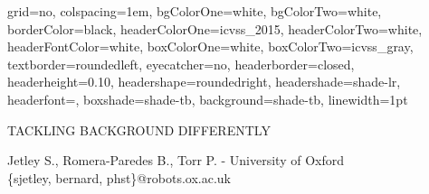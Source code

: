 \documentclass[ICVSS,portrait,final]{baposter}
\begin{document}
\begin{poster}%
  {
  grid=no,
  colspacing=1em,
  bgColorOne=white,
    bgColorTwo=white,
  borderColor=black,
    headerColorOne=icvss_2015,
  headerColorTwo=white,
    headerFontColor=white,
  boxColorOne=white,
  boxColorTwo=icvss_gray,
  textborder=roundedleft,
  eyecatcher=no,
  headerborder=closed,
  headerheight=0.10\textheight,
  headershape=roundedright,
    headershade=shade-lr,
  headerfont=\Large\textsf, %
    boxshade=shade-tb,
  background=shade-tb,
  linewidth=1pt
  }

  {\sf %
  \vspace{0.5em}
  TACKLING BACKGROUND DIFFERENTLY\\
  }
  {\sf %
  \begin{normalsize}Jetley S., Romera-Paredes B., Torr P. - University of
  Oxford\\
  \vspace{0.4em}\{sjetley, bernard, phst\}@robots.ox.ac.uk
  \end{normalsize}
  }
  {
}


\end{poster}
\end{document}
